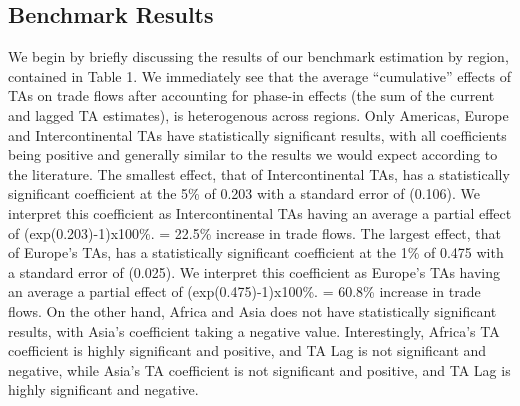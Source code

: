 \documentclass[12pt]{article}%
\begin{document}
\subsection{Benchmark Results}%
\label{subsec:BenchmarkResults}%
We begin by briefly discussing the results of our benchmark estimation
by region, contained in Table 1. We immediately see that the average
``cumulative'' effects of TAs on trade flows after accounting for
phase-in effects (the sum of the current and lagged TA estimates), is
heterogenous across regions. Only Americas, Europe and Intercontinental
TAs have statistically significant results, with all coefficients being
positive and generally similar to the results we would expect according
to the literature. The smallest effect, that of Intercontinental TAs,
has a statistically significant coefficient at the 5\% of 0.203 with a
standard error of (0.106). We interpret this coefficient as
Intercontinental TAs having an average a partial effect of
(exp(0.203)-1)x100\%. = 22.5\% increase in trade flows. The largest
effect, that of Europe's TAs, has a statistically significant
coefficient at the 1\% of 0.475 with a standard error of (0.025). We
interpret this coefficient as Europe's TAs having an average a partial
effect of (exp(0.475)-1)x100\%. = 60.8\% increase in trade flows. On the
other hand, Africa and Asia does not have statistically significant
results, with Asia's coefficient taking a negative value. Interestingly,
Africa's TA coefficient is highly significant and positive, and TA Lag
is not significant and negative, while Asia's TA coefficient is not
significant and positive, and TA Lag is highly significant and negative.
%
%
\FloatBarrier

%
\end{document}
